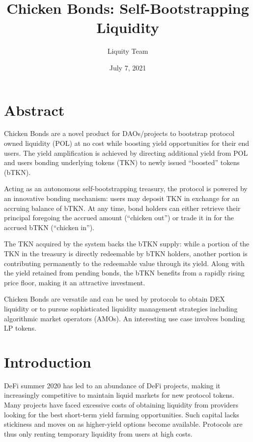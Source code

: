 \documentclass{article}
\begin{document}
\title{\textbf{Chicken Bonds: Self-Bootstrapping Liquidity}}
\author{Liquity Team}
\date{July 7, 2021}

\maketitle

\section*{Abstract}
Chicken Bonds are a novel product for DAOs/projects to bootstrap protocol owned liquidity (POL) at no cost while boosting yield opportunities for their end users. The yield amplification is achieved by directing additional yield from POL and users bonding underlying tokens (TKN) to newly issued “boosted” tokens (bTKN). 

Acting as an autonomous self-bootstrapping treasury, the protocol is powered by an innovative bonding mechanism: users may deposit TKN in exchange for an accruing balance of bTKN. At any time, bond holders can either retrieve their principal foregoing the accrued amount (“chicken out”) or trade it in for the accrued bTKN (“chicken in”).

The TKN acquired by the system backs the bTKN supply: while a portion of the TKN in the treasury is directly redeemable by bTKN holders, another portion is contributing permanently to the redeemable value through its yield. Along with the yield retained from pending bonds, the bTKN benefits from a rapidly rising price floor,  making it an attractive investment.

Chicken Bonds are versatile and can be used by protocols to obtain DEX liquidity or to pursue sophisticated liquidity management strategies including algorithmic market operators (AMOs). An interesting use case involves bonding LP tokens.

\tableofcontents

\section{Introduction}
DeFi summer 2020 has led to an abundance of DeFi projects, making it increasingly competitive to maintain liquid markets for new protocol tokens. Many projects have faced excessive costs of obtaining liquidity from providers looking for the best short-term yield farming opportunities. Such capital lacks stickiness and moves on as higher-yield options become available. Protocols are thus only renting temporary liquidity from users at high costs.
\end{document}
